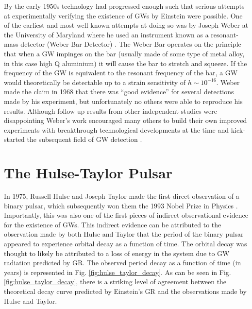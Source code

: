 By the early 1950s technology had progressed enough such that serious 
attempts at experimentally verifying the existence of \ac{GW}s by Einstein were possible. 
One of the earliest and most well-known attempts at doing so was by 
Joseph Weber at the University of Maryland where he used an instrument 
known as a resonant-mass detector (Weber Bar Detector) \cite{PhysRevLett.18.498}. The Weber Bar 
operates on the principle that when a \ac{GW} impinges on the bar (usually 
made of some type of metal alloy, in this case high Q aluminium) it will cause 
the bar to stretch and squeeze. If the frequency of the \ac{GW} is equivalent 
to the resonant frequency of the bar, a \ac{GW} would theoretically be detectable up to a strain 
sensitivity of $h\sim10^{-16}$. Weber made the claim in 1968 that there was 
``good evidence'' for several detections made by his experiment, but unfortunately 
no others were able to reproduce his results. Although follow-up results from 
other independent studies were disappointing 
Weber's work encouraged many others to build their own improved experiments with 
breakthrough technological developments at the time and 
kick-started the subsequent field of \ac{GW} detection \cite{1009.1138}.

\section{The Hulse-Taylor Pulsar}

In 1975, Russell Hulse and Joseph Taylor made the first direct observation 
of a binary pulsar, which subsequently won them the 1993 Nobel Prize in 
Physics \cite{1975ApJ...195L..51H}. Importantly, this was also one of the 
first pieces of indirect observational evidence for the existence of 
\ac{GW}s. This indirect evidence can be attributed to the observation 
made by both Hulse and Taylor that the period of the binary pulsar 
appeared to experience orbital decay as a function of time. The orbital 
decay was thought to likely be attributed to a loss of energy in the 
system due to \ac{GW} radiation predicted by \ac{GR}. The observed period 
decay as a function of time (in years) is represented
in Fig. \ref{fig:hulse_taylor_decay}. As can be seen in Fig. \ref{fig:hulse_taylor_decay}, there is a striking level of agreement 
between the theoretical decay curve predicted by Einstein's \ac{GR} and 
the observations made by Hulse and Taylor.

